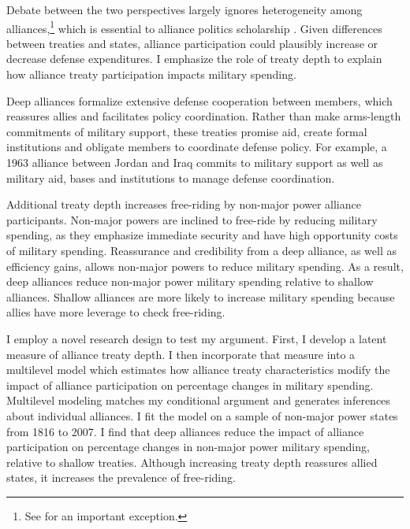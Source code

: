 \documentclass[12pt]{article}
\begin{document}
Debate between the two perspectives largely ignores heterogeneity among alliances,\footnote{See \citet{DigiuseppePoast2016} for an important exception.} which is essential to alliance politics scholarship \citep{Morrow1991, Leeds2003, LeedsAnac2005, Fordham2010, Mattes2012, Benson2012, Poast2013, Johnsonetal2015}.  
Given differences between treaties and states, alliance participation could plausibly increase or decrease defense expenditures. 
I emphasize the role of treaty depth to explain how alliance treaty participation impacts military spending. 


Deep alliances formalize extensive defense cooperation between members, which reassures allies and facilitates policy coordination. 
Rather than make arms-length commitments of military support, these treaties promise aid, create formal institutions and obligate members to coordinate defense policy. 
For example, a 1963 alliance between Jordan and Iraq commits to military support as well as military aid, bases and institutions to manage defense coordination. 


Additional treaty depth increases free-riding by non-major power alliance participants. 
Non-major powers are inclined to free-ride by reducing military spending, as they emphasize immediate security and have high opportunity costs of military spending. 
Reassurance and credibility from a deep alliance, as well as efficiency gains, allows non-major powers to reduce military spending. 
As a result, deep alliances reduce non-major power military spending relative to shallow alliances. 
Shallow alliances are more likely to increase military spending because allies have more leverage to check free-riding. 
 

I employ a novel research design to test my argument.
First, I develop a latent measure of alliance treaty depth. 
I then incorporate that measure into a multilevel model which estimates how alliance treaty characteristics modify the impact of alliance participation on percentage changes in military spending.
Multilevel modeling matches my conditional argument and generates inferences about individual alliances. 
I fit the model on a sample of non-major power states from 1816 to 2007. 
I find that deep alliances reduce the impact of alliance participation on percentage changes in non-major power military spending, relative to shallow treaties.
Although increasing treaty depth reassures allied states, it increases the prevalence of free-riding. 
\end{document}
